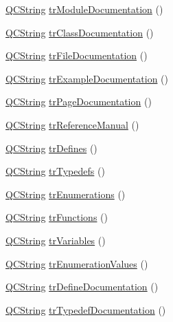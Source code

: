 \begin{DoxyCompactItemize}
\item 
\hyperlink{class_q_c_string}{Q\-C\-String} \hyperlink{class_translator_italian_a574451365382668d557ed4c0063f3247}{tr\-Module\-Documentation} ()
\item 
\hyperlink{class_q_c_string}{Q\-C\-String} \hyperlink{class_translator_italian_a8353ca44fdd34652e76c88e30dd57ecf}{tr\-Class\-Documentation} ()
\item 
\hyperlink{class_q_c_string}{Q\-C\-String} \hyperlink{class_translator_italian_ad31ca23ecea4c65b74fcc709f4f7c2ae}{tr\-File\-Documentation} ()
\item 
\hyperlink{class_q_c_string}{Q\-C\-String} \hyperlink{class_translator_italian_a2d5994817321120d26ccadab25a5faf7}{tr\-Example\-Documentation} ()
\item 
\hyperlink{class_q_c_string}{Q\-C\-String} \hyperlink{class_translator_italian_a9c6f3fbd29c3bea6c7a41ba250666dec}{tr\-Page\-Documentation} ()
\item 
\hyperlink{class_q_c_string}{Q\-C\-String} \hyperlink{class_translator_italian_aea91b0be7750efb5f40a2882dec61423}{tr\-Reference\-Manual} ()
\item 
\hyperlink{class_q_c_string}{Q\-C\-String} \hyperlink{class_translator_italian_ab3f2a56beba05cd65b3f01e82833a02e}{tr\-Defines} ()
\item 
\hyperlink{class_q_c_string}{Q\-C\-String} \hyperlink{class_translator_italian_a07aff7fd650868f45400ccef334f9d58}{tr\-Typedefs} ()
\item 
\hyperlink{class_q_c_string}{Q\-C\-String} \hyperlink{class_translator_italian_afe48b3530791c5a63f53d8f169821a96}{tr\-Enumerations} ()
\item 
\hyperlink{class_q_c_string}{Q\-C\-String} \hyperlink{class_translator_italian_ae0c9871b44442dd1d31fd216cc9c2d54}{tr\-Functions} ()
\item 
\hyperlink{class_q_c_string}{Q\-C\-String} \hyperlink{class_translator_italian_a5c1a1611a3056c701987028528bceb1e}{tr\-Variables} ()
\item 
\hyperlink{class_q_c_string}{Q\-C\-String} \hyperlink{class_translator_italian_ac1f83fcaebb678320fc2286e9a89028c}{tr\-Enumeration\-Values} ()
\item 
\hyperlink{class_q_c_string}{Q\-C\-String} \hyperlink{class_translator_italian_aac6b7b23798753a3c86f20b55ef4e2e4}{tr\-Define\-Documentation} ()
\item 
\hyperlink{class_q_c_string}{Q\-C\-String} \hyperlink{class_translator_italian_a1611eb91129bc7fbac2586a1b913710d}{tr\-Typedef\-Documentation} ()

\end{DoxyCompactItemize}
